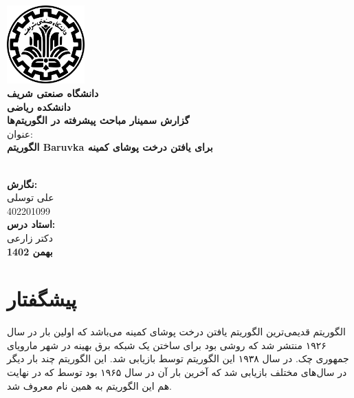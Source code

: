 \documentclass[11pt, oneside]{article}
\begin{document}
	\begin{titlepage}
		\linespread{1.5}
		\centering
		\includegraphics[width=3cm]{sharif-logo.png}\\[\bigskipamount]
		\normalsize	\textbf{دانشگاه صنعتی شریف}\\
		\textbf{دانشکده ریاضی}\\
		\textbf{گزارش سمینار مباحث پیشرفته در الگوریتم‌ها}%
		\\[1.3cm]

		{\LARGE		عنوان:\\
		\textbf{الگوریتم Baruvka برای یافتن درخت پوشای کمینه}\\
		\textbf{\lr{}}\\[2cm]}

		{\Large
		\textbf{نگارش:} \\
		علی توسلی\\
		402201099\\[1.3cm]

		\textbf{استاد درس:}\\
		دکتر زارعی\\[1.3cm]
		\vfill
		\textbf{بهمن 1402}
		}
	\end{titlepage}
	\clearpage
	\setcounter{figure}{0}




    \newcommand{\code}[1]{\colorbox{lightgray}{\lr{#1}}}
    \newcommand{\Argmin}[1]{\underset{#1}{\text{argmin}} \hspace{2mm}}
    \newcommand{\Argmax}[1]{\underset{#1}{\text{argmax}} \hspace{2mm}}
    
    \newcommand{\prob}[2][ ]{\mathbb{P}_{#1}\left[#2\right]}
    \newcommand{\expec}[2][ ]{\mathbb{E}_{#1}\left[#2\right]}
    \newcommand{\REF}[1]{\lr{(\ref{#1})}}
    \newtheorem{definition}{تعریف}
    \newtheorem{theorem}{قضیه}
    
    \tableofcontents
    \pagebreak
    \section{پیشگفتار}
    الگوریتم  \cite{c1} قدیمی‌ترین الگوریتم یافتن درخت پوشای کمینه می‌باشد که اولین بار در سال ۱۹۲۶ منتشر شد که روشی بود برای ساختن یک شبکه برق بهینه در شهر مارویای جمهوری چک. در سال ۱۹۳۸ این الگوریتم توسط  بازیابی شد. این الگوریتم چند بار دیگر در سال‌های مختلف بازیابی شد که آخرین بار آن در سال ۱۹۶۵ بود توسط  که در نهایت هم این الگوریتم به همین نام معروف شد.
    
\end{document}
